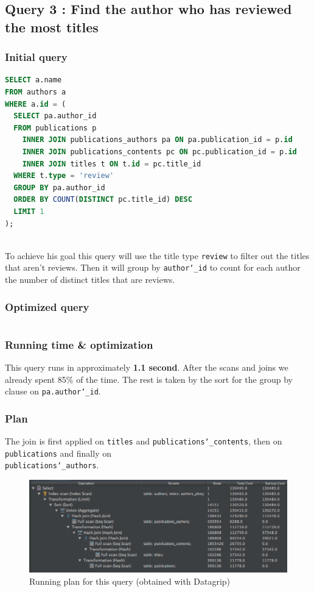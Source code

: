 \documentclass[doubleside, titlepage]{article}
\begin{document}
\subsection{Query 3 : Find the author who has reviewed the most titles}

\subsubsection{Initial query}
		\begin{lstlisting}[language=SQL,showspaces=false,basicstyle=\ttfamily,numberstyle=\tiny,commentstyle=\color{gray}]
SELECT a.name
FROM authors a
WHERE a.id = (
  SELECT pa.author_id
  FROM publications p
    INNER JOIN publications_authors pa ON pa.publication_id = p.id
    INNER JOIN publications_contents pc ON pc.publication_id = p.id
    INNER JOIN titles t ON t.id = pc.title_id
  WHERE t.type = 'review'
  GROUP BY pa.author_id
  ORDER BY COUNT(DISTINCT pc.title_id) DESC
  LIMIT 1
);
		\end{lstlisting}

~\\
To achieve his goal this query will use the title type \texttt{review} to filter out the titles that aren't reviews. Then it will group by \texttt{author\char`_id} to count for each author the number of distinct titles that are reviews.
~\\
		
\subsubsection{Optimized query}
		\begin{lstlisting}[language=SQL,showspaces=false,basicstyle=\ttfamily,numberstyle=\tiny,commentstyle=\color{gray}]

		\end{lstlisting}
		
\subsubsection{Running time \& optimization}

This query runs in approximately \textbf{1.1 second}. After the scans and joins we already spent 85\% of the time. The rest is taken by the sort for the group by clause on \texttt{pa.author\char`_id}. 


\subsubsection{Plan}
The join is first applied on \texttt{titles} and \texttt{publications\char`_contents}, then on \texttt{publications} and finally on ~\\ \texttt{publications\char`_authors}.

\begin{figure}[!htb]
	\centering
    \includegraphics[scale = 0.5]{./query_analysis/query21}
    \caption{Running plan for this query (obtained with Datagrip)}
\end{figure}
\end{document}
